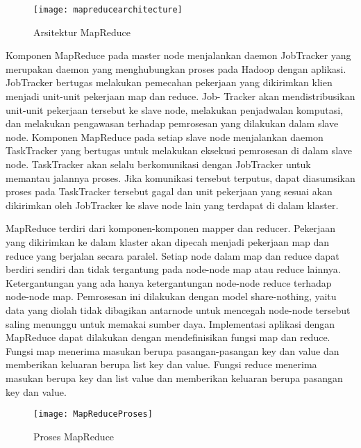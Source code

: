 \begin{itemize}
{	
		\begin{figure}[H] 
		\centering  
		\texttt{[image: mapreducearchitecture]}  
		\caption[Gambar Arsitektur MapReduce]{Arsitektur MapReduce} 
		\label{fig:HDFS Architecture} 
		\end{figure}
		
	Komponen MapReduce pada master node menjalankan daemon JobTracker yang merupakan
	daemon yang menghubungkan proses pada Hadoop dengan aplikasi. JobTracker bertugas melakukan
	pemecahan pekerjaan yang dikirimkan klien menjadi unit-unit pekerjaan map dan reduce. Job-
	Tracker akan mendistribusikan unit-unit pekerjaan tersebut ke slave node, melakukan penjadwalan
	komputasi, dan melakukan pengawasan terhadap pemrosesan yang dilakukan dalam slave node.
	Komponen MapReduce pada setiap slave node menjalankan daemon TaskTracker yang bertugas
	untuk melakukan eksekusi pemrosesan di dalam slave node. TaskTracker akan selalu berkomunikasi
	dengan JobTracker untuk memantau jalannya proses. Jika komunikasi tersebut terputus, dapat
	diasumsikan proses pada TaskTracker tersebut gagal dan unit pekerjaan yang sesuai akan 					dikirimkan oleh JobTracker ke slave node lain yang terdapat di dalam klaster.
	
	MapReduce terdiri dari komponen-komponen mapper dan reducer. Pekerjaan yang dikirimkan
	ke dalam klaster akan dipecah menjadi pekerjaan map dan reduce yang berjalan secara paralel.
	Setiap node dalam map dan reduce dapat berdiri sendiri dan tidak tergantung pada node-node map
	atau reduce lainnya. Ketergantungan yang ada hanya ketergantungan node-node reduce terhadap
	node-node map. Pemrosesan ini dilakukan dengan model share-nothing, yaitu data yang diolah
	tidak dibagikan antarnode untuk mencegah node-node tersebut saling menunggu untuk memakai
	sumber daya. Implementasi aplikasi dengan MapReduce dapat dilakukan dengan mendefinisikan fungsi 	map dan reduce. Fungsi map menerima masukan berupa pasangan-pasangan key dan value dan 					memberikan keluaran berupa list key dan value. Fungsi reduce menerima masukan berupa key dan 			list value dan memberikan keluaran berupa pasangan key dan value.
	
		\begin{figure}[H] 
		\centering  
		\texttt{[image: MapReduceProses]}  
		\caption[Gambar Proses MapReduce]{Proses MapReduce} 
		\label{fig:processing-events relationship} 
		\end{figure}
	
}
\end{itemize}
